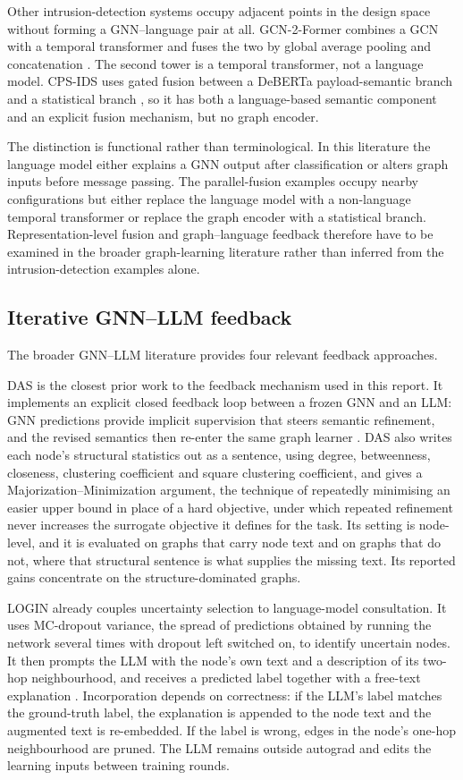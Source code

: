 Other intrusion-detection systems occupy adjacent points in the design space without forming
a GNN--language pair at all. GCN-2-Former combines a GCN with a temporal transformer and
fuses the two by global average pooling and concatenation \citep{gcn2former2025}. The second
tower is a temporal transformer, not a language model. CPS-IDS uses gated fusion between a
DeBERTa payload-semantic branch and a statistical branch \citep{xiong2026cpsids}, so it has
both a language-based semantic component and an explicit fusion mechanism, but no graph
encoder.

The distinction is functional rather than terminological. In this literature the language
model either explains a GNN output after classification or alters graph inputs before
message passing. The parallel-fusion examples occupy nearby configurations but either
replace the language model with a non-language temporal transformer or replace the graph
encoder with a statistical branch. Representation-level fusion and graph--language feedback
therefore have to be examined in the broader graph-learning literature rather than inferred
from the intrusion-detection examples alone.

\subsection{Iterative GNN--LLM feedback}

The broader GNN--LLM literature provides four relevant feedback approaches.

DAS is the closest prior work to the feedback mechanism used in this report. It implements
an explicit closed feedback loop between a frozen GNN and an LLM: GNN predictions provide
implicit supervision that steers semantic refinement, and the revised semantics then re-enter
the same graph learner \citep{thapaliya2025das}. DAS also writes each node's structural
statistics out as a sentence, using degree, betweenness, closeness, clustering coefficient and
square clustering coefficient, and gives a Majorization--Minimization argument, the technique of
repeatedly minimising an easier upper bound in place of a hard objective, under which repeated
refinement never increases the surrogate objective it defines for the task. Its setting is
node-level, and it is evaluated on graphs that carry node text and on graphs that do not, where
that structural sentence is what supplies the missing text. Its reported gains concentrate on
the structure-dominated graphs.

LOGIN already couples uncertainty selection to language-model consultation. It uses
MC-dropout variance, the spread of predictions obtained by running the network several times
with dropout left switched on, to identify uncertain nodes. It then prompts the LLM with the
node's own text and a description of its two-hop neighbourhood, and receives a predicted label
together with a free-text explanation
\citep{qiao2025login}. Incorporation depends on correctness: if the LLM's label matches the
ground-truth label, the explanation is appended to the node text and the augmented text is
re-embedded. If the label is wrong, edges in the node's one-hop neighbourhood are pruned.
The LLM remains outside autograd and edits the learning inputs between training rounds.


